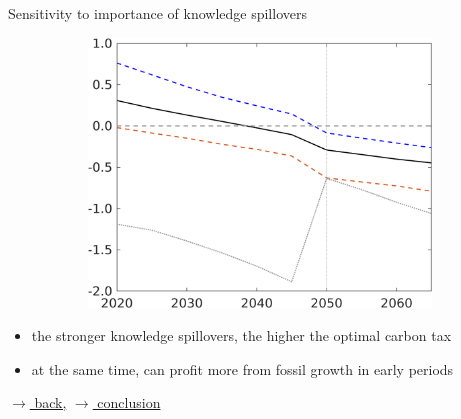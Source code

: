 \documentclass[11pt,aspectratio=169]{beamer}
\begin{document}
\begin{frame}{Sensitivity to importance of knowledge spillovers}
\begin{figure}[h!!]
\begin{subfigure}{0.45\textwidth}
			\includegraphics[width=1\textwidth]{../codding_model/own_basedOnFried/optimalPol_010922_revision/figures/all_13Sept22/NewCalib_Sens_TvsNoT_dTaulAvS_emnet1_Sun2_spillover0_knspil3_xgr0_nsk0_sep0_extern0_PV1_etaa0.79_lgd0.png}
		\end{subfigure}
	\end{figure}
	\vspace{2mm}
	\begin{block}{}
		\begin{itemize}
			\item the stronger knowledge spillovers, the higher the optimal carbon tax
			\item at the same time, can profit more from fossil growth in early periods
		\end{itemize}
	\end{block}	
	
	\vspace{-6mm}
	\hfill
	\hyperlink{backOPT}{\tiny{$\rightarrow$ back,}}	\hyperlink{conc}{\tiny{$\rightarrow$ conclusion}}
\end{frame}
\end{document}
